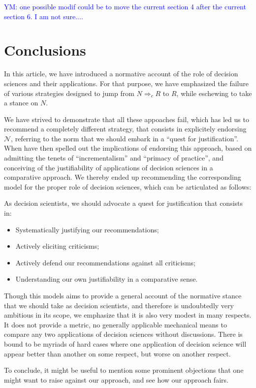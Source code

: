 \documentclass[preprint, french, english, 11pt, authoryear]{elsarticle}%
\newcommand{\commentYM}[1]{\textcolor{blue}{YM: #1}}
\newcommand{\adv}{\mathscr{N}}
\begin{document}
\commentYM{one possible modif could be to move the current section 4 after the current section 6. I am not sure....}

\section{Conclusions}
In this article, we have introduced a normative account of the role of decision sciences and their applications. For that purpose, we have emphasized the failure of various strategies designed  to jump from $N ⇒_c R$ to $R$, while eschewing to take a stance on $N$.

We have strived to demonstrate that all these appoaches fail, which has led us to recommend a completely different strategy, that consists in explicitely endorsing $\adv$, referring to the norm that we should embark in a ``quest for justification''. When have then spelled out the implications of endorsing this approach, based on admitting the tenets of ``incrementalism'' and ``primacy of practice'', and conceiving of the justifiability of applications of decision sciences in a comparative approach. We thereby ended up recommending the corresponding model for the proper role of decision sciences, which can be articulated as follows:

As decision scientists, we should advocate a quest for justification that consists in:
\begin{itemize}
	\item Systematically justifying our recommendations;
	\item Actively eliciting criticisms;
	\item Actively defend our recommendations against all criticisms;
	\item Understanding our own justifiability in a comparative sense.
\end{itemize}

Though this models aims to provide a general account of the normative stance that we should take as decision scientists, and therefore is undoubtedly very ambitious in its scope, we emphasize that it is also very modest in many respects. It does not provide a metric, no generally applicable mechanical means to compare any two applications of decision sciences without discussions. There is bound to be myriads of hard cases where one application of decision science will appear better than another on some respect, but worse on another respect.

To conclude, it might be useful to mention some prominent objections that one might want to raise against our approach, and see how our approach fairs.
\end{document}
